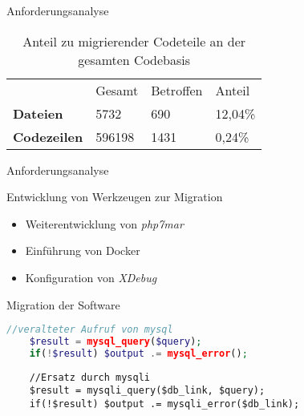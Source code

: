 \begin{frame} {Anforderungsanalyse}
    \begin{table}
        \centering
        \caption{Anteil zu migrierender Codeteile an der gesamten Codebasis}
        \label{tab:migrationPercentage}
        \begin{tabular}{llll}
                            & Gesamt & Betroffen & Anteil   \\
        \textbf{Dateien}    & 5732   & 690       & 12,04\%  \\
        \textbf{Codezeilen} & 596198 & 1431      & 0,24\%  
        \end{tabular}
    \end{table}
\end{frame}

\begin{frame} {Anforderungsanalyse}
    \begin{figure}
    \end{figure}
\end{frame}

\begin{frame} {Entwicklung von Werkzeugen zur Migration}
    \begin{itemize}
        \item Weiterentwicklung von \emph{php7mar}
        \item Einführung von Docker
        \item Konfiguration von \emph{XDebug}
    \end{itemize}
\end{frame}

\begin{frame}[fragile] {Migration der Software}
    \begin{lstlisting}[language=php]
    //veralteter Aufruf von mysql
    $result = mysql_query($query);
    if(!$result) $output .= mysql_error();
    \end{lstlisting}
    \begin{lstlisting}
    //Ersatz durch mysqli
    $result = mysqli_query($db_link, $query);
    if(!$result) $output .= mysqli_error($db_link);
    \end{lstlisting}
\end{frame}

